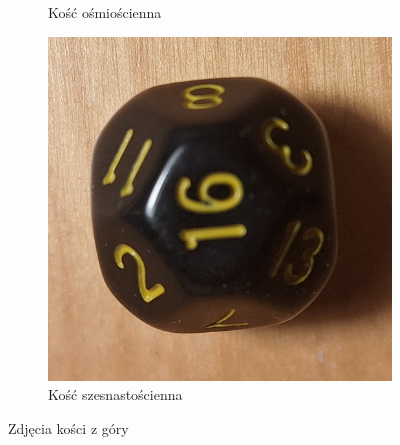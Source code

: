 \begin{figure}[h]
\begin{subfigure}{.3\textwidth}
        \caption{\label{fig:k8}Kość ośmiościenna}
      \end{subfigure}%
       \begin{subfigure}{.3\textwidth}
        \includegraphics[width=.9\textwidth, angle=-90, clip]{chapters/02-teoria/figures/k16}
        \caption{\label{fig:k16}Kość szesnastościenna}
      \end{subfigure}
    \caption{Zdjęcia kości z góry}
\end{figure}

